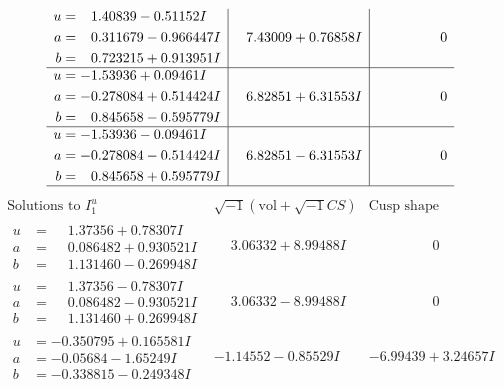 \documentclass[1p]{elsarticle_modified}
\theoremstyle{definition}
\newcommand{\I}{\sqrt{-1}}
\begin{document}
$$\begin{array}{c|c|c}
\begin{aligned}
u &= \phantom{-}1.40839 - 0.51152 I \\
a &= \phantom{-}0.311679 - 0.966447 I \\
b &= \phantom{-}0.723215 + 0.913951 I\end{aligned}
 & \phantom{-}7.43009 + 0.76858 I & \phantom{-0.000000 } 0 \\ \hline\begin{aligned}
u &= -1.53936 + 0.09461 I \\
a &= -0.278084 + 0.514424 I \\
b &= \phantom{-}0.845658 - 0.595779 I\end{aligned}
 & \phantom{-}6.82851 + 6.31553 I & \phantom{-0.000000 } 0 \\ \hline\begin{aligned}
u &= -1.53936 - 0.09461 I \\
a &= -0.278084 - 0.514424 I \\
b &= \phantom{-}0.845658 + 0.595779 I\end{aligned}
 & \phantom{-}6.82851 - 6.31553 I & \phantom{-0.000000 } 0\\
 \hline 
 \end{array}$$\newpage$$\begin{array}{c|c|c}  
\text{Solutions to }I^u_{1}& \I (\text{vol} + \sqrt{-1}CS) & \text{Cusp shape}\\
 \hline 
\begin{aligned}
u &= \phantom{-}1.37356 + 0.78307 I \\
a &= \phantom{-}0.086482 + 0.930521 I \\
b &= \phantom{-}1.131460 - 0.269948 I\end{aligned}
 & \phantom{-}3.06332 + 8.99488 I & \phantom{-0.000000 } 0 \\ \hline\begin{aligned}
u &= \phantom{-}1.37356 - 0.78307 I \\
a &= \phantom{-}0.086482 - 0.930521 I \\
b &= \phantom{-}1.131460 + 0.269948 I\end{aligned}
 & \phantom{-}3.06332 - 8.99488 I & \phantom{-0.000000 } 0 \\ \hline\begin{aligned}
u &= -0.350795 + 0.165581 I \\
a &= -0.05684 - 1.65249 I \\
b &= -0.338815 - 0.249348 I\end{aligned}
 & -1.14552 - 0.85529 I & -6.99439 + 3.24657 I \\ \hline\begin{aligned}

\end{aligned}
\end{array}$$
\end{document}
